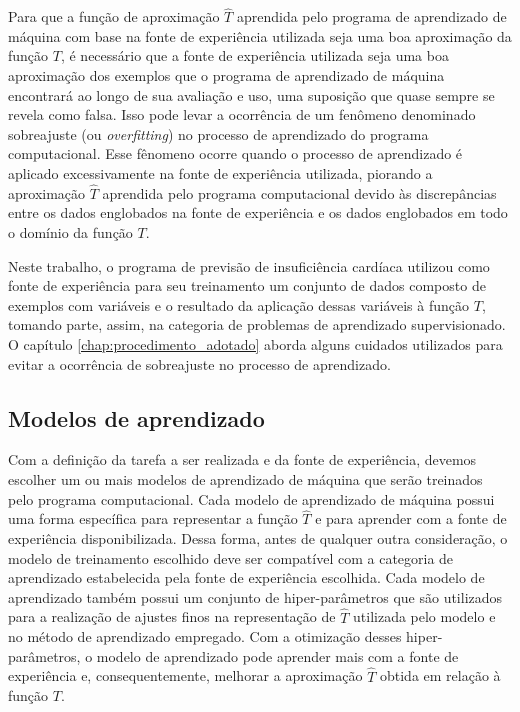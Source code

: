 Para que a função de aproximação $\hat{T}$ aprendida pelo programa de aprendizado de máquina com base na fonte de experiência utilizada seja uma boa aproximação da função $T$, é necessário que a fonte de experiência utilizada seja uma boa aproximação dos exemplos que o programa de aprendizado de máquina encontrará ao longo de sua avaliação e uso, uma suposição que quase sempre se revela como falsa.\cite[p.6]{machine_learning} Isso pode levar a ocorrência de um fenômeno denominado sobreajuste (ou \textit{overfitting}) no processo de aprendizado do programa computacional. Esse fênomeno ocorre quando o processo de aprendizado é aplicado excessivamente na fonte de experiência utilizada, piorando a aproximação $\hat{T}$ aprendida pelo programa computacional devido às discrepâncias entre os dados englobados na fonte de experiência e os dados englobados em todo o domínio da função $T$.

Neste trabalho, o programa de previsão de insuficiência cardíaca utilizou como fonte de experiência para seu treinamento um conjunto de dados\cite{larxel_dataset} composto de exemplos com variáveis e o resultado da aplicação dessas variáveis à função $T$, tomando parte, assim, na categoria de problemas de aprendizado supervisionado. O capítulo \ref{chap:procedimento_adotado} aborda alguns cuidados utilizados para evitar a ocorrência de sobreajuste no processo de aprendizado.

\subsection{Modelos de aprendizado}

Com a definição da tarefa a ser realizada e da fonte de experiência, devemos escolher um ou mais modelos de aprendizado de máquina que serão treinados pelo programa computacional. Cada modelo de aprendizado de máquina possui uma forma específica para representar a função $\hat{T}$ e para aprender com a fonte de experiência disponibilizada. Dessa forma, antes de qualquer outra consideração, o modelo de treinamento escolhido deve ser compatível com a categoria de aprendizado estabelecida pela fonte de experiência escolhida. Cada modelo de aprendizado também possui um conjunto de hiper-parâmetros que são utilizados para a realização de ajustes finos na representação de $\hat{T}$ utilizada pelo modelo e no método de aprendizado empregado. Com a otimização desses hiper-parâmetros, o modelo de aprendizado pode aprender mais com a fonte de experiência e, consequentemente, melhorar a aproximação $\hat{T}$ obtida em relação à função $T$.

